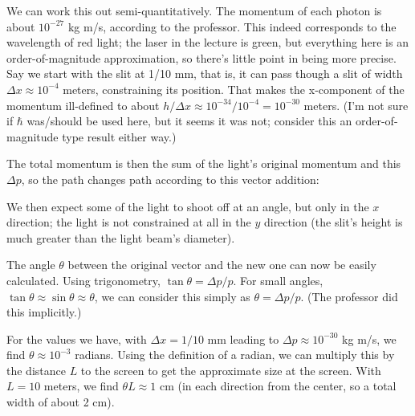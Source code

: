 We can work this out semi-quantitatively. The momentum of each photon is about $10^{-27}$ kg m/s, according to the professor. This indeed corresponds to the wavelength of red light; the laser in the lecture is green, but everything here is an order-of-magnitude approximation, so there's little point in being more precise.\\
Say we start with the slit at 1/10 mm, that is, it can pass though a slit of width $\Delta x \approx 10^{-4}$ meters, constraining its position. That makes the x-component of the momentum ill-defined to about $h/\Delta x \approx 10^{-34} / 10^{-4} = 10^{-30}$ meters. (I'm not sure if $\hbar$ was/should be used here, but it seems it was not; consider this an order-of-magnitude type result either way.)

The total momentum is then the sum of the light's original momentum and this $\Delta p$, so the path changes path according to this vector addition:

\begin{figure}[H]
  \centering
{}
\end{figure}

We then expect some of the light to shoot off at an angle, but only in the $x$ direction; the light is not constrained at all in the $y$ direction (the slit's height is much greater than the light beam's diameter).

The angle $\theta$ between the original vector and the new one can now be easily calculated. Using trigonometry, $\tan \theta = \Delta p / p$. For small angles, $\tan \theta \approx \sin \theta \approx \theta$, we can consider this simply as $\theta = \Delta p / p$. (The professor did this implicitly.)

For the values we have, with $\Delta x = 1/10$ mm leading to $\Delta p \approx 10^{-30}$ kg m/s, we find $\theta \approx 10^{-3}$ radians. Using the definition of a radian, we can multiply this by the distance $L$ to the screen to get the approximate size at the screen. With $L = 10$ meters, we find $\theta L \approx 1$ cm (in each direction from the center, so a total width of about 2 cm).

